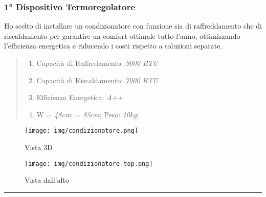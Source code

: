 \documentclass[italian, 12pt, a4paper]{article}
\begin{document}
\subsubsection{1° Dispositivo Termoregolatore}
Ho scelto di installare un condizionatore con funzione sia di raffreddamento che di riscaldamento per garantire un comfort ottimale tutto l'anno, ottimizzando l'efficienza energetica e riducendo i costi rispetto a soluzioni separate.
\begin{quote}
    \begin{enumerate}
        \item Capacità di Raffredamento: \emph{9000 BTU}
        \item Capacità di Riscaldamento: \emph{7000 BTU}
        \item Efficienza Energetica: \emph{A++}
        \item W = \emph{48cm};  = \emph{85cm}; Peso: \emph{10kg}; 
    \end{enumerate}
\end{quote}
\begin{figure}[h!]
    \centering
    \begin{minipage}{0.45\textwidth}
        \centering
        \texttt{[image: img/condizionatore.png]} %
        \caption{Vista 3D}
    \end{minipage} \hfill
    \begin{minipage}{0.45\textwidth}
        \centering
        \texttt{[image: img/condizionatore-top.png]} %
        \caption{Vista dall'alto}
    \end{minipage}
\end{figure}
\hrule
\end{document}
